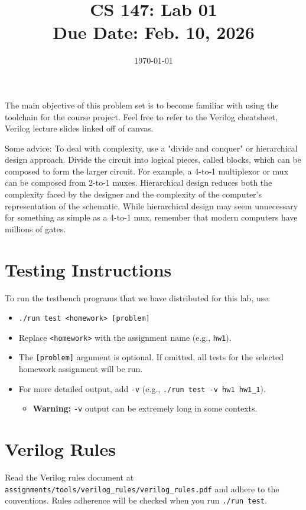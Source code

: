 \documentclass[12pt]{article}
\title{CS 147: Lab 01 \\ Due Date: Feb. 10, 2026}
\author{}
\date{\today}
\begin{document}
\maketitle
The main objective of this problem set is to become familiar with using the toolchain for the course project.  
Feel free to refer
to the Verilog cheatsheet, Verilog lecture slides linked off of canvas. 

Some advice:  To deal with complexity, use a "divide and conquer" or hierarchical design approach. Divide the circuit into logical pieces, called blocks, which can be composed to form the larger circuit. For example, a 4-to-1 multiplexor or mux can be composed from 2-to-1 muxes. Hierarchical design reduces both the complexity faced by the designer and the complexity of the computer's representation of the schematic. While hierarchical design may seem unnecessary for something as simple as a 4-to-1 mux, remember that modern computers have millions of gates.

\section*{Testing Instructions}

To run the testbench programs that we have distributed for this lab, use:
\begin{itemize}
\item \texttt{./run test <homework> [problem]}
\item Replace \texttt{<homework>} with the assignment name (e.g., \texttt{hw1}).
\item The \texttt{[problem]} argument is optional. If omitted, all tests for the selected homework assignment will be run.
\item For more detailed output, add \texttt{-v} (e.g., \texttt{./run test -v hw1 hw1\_1}).
\begin{itemize}
\item \textbf{Warning:} \texttt{-v} output can be extremely long in some contexts.
\end{itemize}
\end{itemize}

\section*{Verilog Rules}
Read the Verilog rules document at \texttt{assignments/tools/verilog\_rules/verilog\_rules.pdf} and adhere to the conventions.
Rules adherence will be checked when you run \texttt{./run test}.
\end{document}
